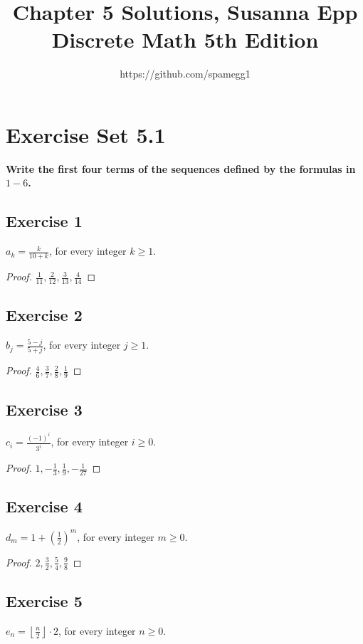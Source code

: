 \documentclass[14pt]{extarticle}
\title{Chapter 5 Solutions, Susanna Epp Discrete Math 5th Edition}
\author{https://github.com/spamegg1}
\newcommand{\dps}{\displaystyle}
\newcommand{\floor}[1]{{\left\lfloor#1\right\rfloor}}
\newcommand{\cy}{\color{cyan}}
\begin{document}
\maketitle
\tableofcontents

\section{Exercise Set 5.1}

{\bf \cy Write the first four terms of the sequences defined by the formulas in $1-6$.}

\subsection{Exercise 1}
$\dps a_k  = \frac{k}{10 + k}$, for every integer $k \geq 1$.

\begin{proof}
$\dps\frac{1}{11}, \frac{2}{12}, \frac{3}{13}, \frac{4}{14}$
\end{proof}

\subsection{Exercise 2}
$\dps b_j  = \frac{5-j}{5+j}$, for every integer $j \geq 1$.

\begin{proof}
$\dps\frac{4}{6}, \frac{3}{7}, \frac{2}{8}, \frac{1}{9}$
\end{proof}

\subsection{Exercise 3}
$\dps c_i  = \frac{(-1)^i}{3^i}$, for every integer $i \geq 0$.

\begin{proof}
$\dps 1, -\frac{1}{3}, \frac{1}{9}, -\frac{1}{27}$
\end{proof}

\subsection{Exercise 4}
$\dps d_m  = 1 + \left(\frac{1}{2}\right)^m$, for every integer $m \geq 0$.

\begin{proof}
$\dps 2, \frac{3}{2}, \frac{5}{4}, \frac{9}{8}$
\end{proof}

\subsection{Exercise 5}
$\dps e_n  = \floor{\frac{n}{2}}\cdot 2$, for every integer $n \geq 0$.
\end{document}
